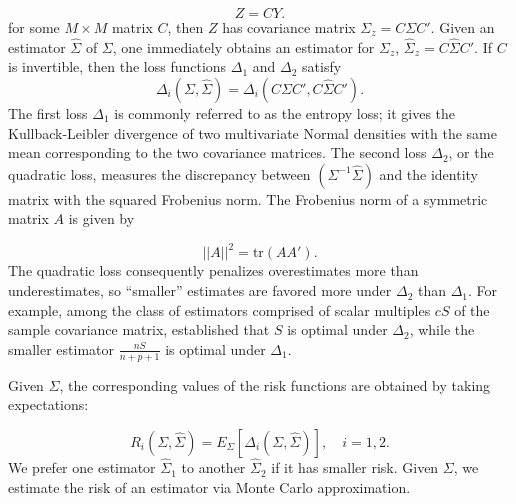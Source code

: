 \[
Z = CY. 
\]
\noindent
for some $M \times M$ matrix $C$,  then $Z$ has covariance matrix $\Sigma_z = C \Sigma C'$. Given an estimator $\hat{\Sigma}$ of $\Sigma$, one immediately obtains an estimator for $\Sigma_z$, $\hat{\Sigma}_z = C \hat{\Sigma} C'$. If $C$ is invertible, then the loss functions $\Delta_1$ and $\Delta_2$ satisfy
\[
\Delta_i\left(\Sigma,\hat{\Sigma}\right) = \Delta_i\left(C \Sigma C', C \hat{\Sigma}C' \right). 
\]
\noindent
The first loss $\Delta_1$ is commonly referred to as the entropy loss; it gives the Kullback-Leibler divergence of two multivariate Normal densities with the same mean corresponding to the two covariance matrices. The second loss $\Delta_2$, or the quadratic loss, measures the discrepancy between $\left(\Sigma^{-1} \hat{\Sigma}\right)$ and the identity matrix with the squared Frobenius norm. The Frobenius norm of a symmetric matrix $A$ is given by 

\[
\vert \vert A \vert \vert^2 = \mbox{tr}\left(A A'\right).
\]
\noindent
The quadratic loss consequently penalizes overestimates more than underestimates, so ``smaller'' estimates are favored more under $\Delta_2$ than $\Delta_1$. For example, among the class of estimators comprised of scalar multiples $cS$ of the sample covariance matrix, \cite{haff1980empirical} established that $S$ is optimal under $\Delta_2$, while the smaller estimator $\frac{nS}{n+p+1}$ is optimal under $\Delta_1$. 

\bigskip

Given $\Sigma$, the corresponding values of the risk functions are obtained by taking expectations:

\begin{equation*}
R_i \left(\Sigma,\hat{\Sigma}\right) = E_\Sigma\left[\Delta_i\left(\Sigma,\hat{\Sigma}\right)\right], \quad i = 1,2.
\end{equation*}
\noindent
We prefer one estimator $\hat{\Sigma}_1$ to another $\hat{\Sigma}_2$ if it has smaller risk.  Given $\Sigma$, we estimate the risk of an estimator via Monte Carlo approximation. 
%


